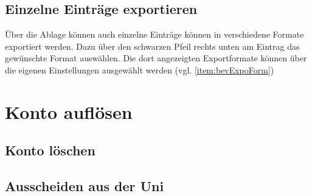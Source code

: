 \subsection{Einzelne Einträge exportieren}
Über die Ablage können auch einzelne Einträge können in verschiedene Formate exportiert werden. Dazu über den schwarzen Pfeil rechts unten am Eintrag das gewünschte Format auswählen. Die dort angezeigten Exportformate können über die eigenen Einstellungen ausgewählt werden (vgl. \autoref{item:bevExpoForm})

\section{Konto auflösen}
\label{sec:kontoAufloesen} 
\subsection{Konto löschen} \label{subsec:kontoAufloesen}
\subsection{Ausscheiden aus der Uni} \label{subsec:kontoLoeschen}
